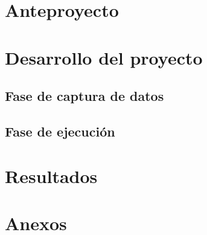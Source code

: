 \documentclass[12pt, twoside]{report}
\begin{document}


%

\newpage
\renewcommand{\contentsname}{\'Indice}
\tableofcontents

\newpage
\renewcommand{\listtablename}{Lista de tablas}
\listoftables

\newpage
\renewcommand{\listfigurename}{Lista de figuras}
\listoffigures

\newpage
\chapter{Anteproyecto}



%
\newpage


%
\newpage


%
\newpage


%
\newpage


%
\newpage


%
\newpage


\newpage
\chapter{Desarrollo del proyecto}

\section{Fase de captura de datos}











\newpage
\section{Fase de ejecución}







\newpage
\chapter{Resultados}

\newpage
\renewcommand{\bibname}{Referencias}



\newpage
\chapter{Anexos}\label{cap:anexos}

\end{document}
